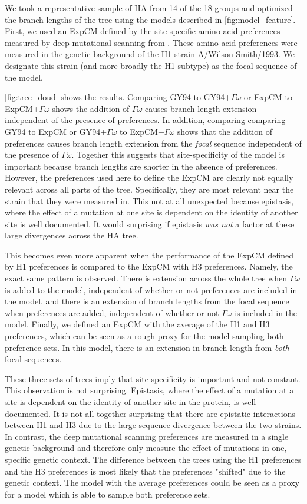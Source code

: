 \documentclass[11pt]{article}
\begin{document}
We took a representative sample of HA from 14 of the 18 groups and optimized the branch lengths of the tree using the models described in \ref{fig:model_feature}. 
First, we used an ExpCM defined by the site-specific amino-acid preferences measured by deep mutational scanning from \cite{doud2016accurate}. 
These amino-acid preferences were measured in the genetic background of the H1 strain A/Wilson-Smith/1993. 
We designate this strain (and more broadly the H1 subtype) as the focal sequence of the model. 

\ref{fig:tree_doud} shows the results. 
Comparing GY94 to GY94+$\Gamma\omega$ or ExpCM to ExpCM+$\Gamma\omega$ shows the addition of $\Gamma\omega$ causes branch length extension independent of the presence of preferences. 
In addition, comparing comparing GY94 to ExpCM or GY94+$\Gamma\omega$ to ExpCM+$\Gamma\omega$ shows that the addition of preferences causes branch length extension from the \textit{focal} sequence independent of the presence of $\Gamma\omega$. 
Together this suggests that site-specificity of the model is important because branch lengths are shorter in the absence of preferences. 
However, the preferences used here to define the ExpCM are clearly not equally relevant across all parts of the tree. 
Specifically, they are most relevant near the strain that they were measured in. 
This not at all unexpected because epistasis, where the effect of a mutation at one site is dependent on the identity of another site is well documented. 
It would surprising if epistasis \textit{was not} a factor at these large divergences across the HA tree. 

This becomes even more apparent when the performance of the ExpCM defined by H1 preferences is compared to the ExpCM with H3 preferences. 
Namely, the exact same pattern is observed. 
There is extension across the whole tree when $\Gamma\omega$ is added to the model, independent of whether or not preferences are included in the model, and there is an extension of branch lengths from the focal sequence when preferences are added, independent of whether or not $\Gamma\omega$ is included in the model. 
Finally, we defined an ExpCM with the average of the H1 and H3 preferences, which can be seen as a rough proxy for the model sampling both preference sets. 
In this model, there is an extension in branch length from \textit{both} focal sequences. 

These three sets of trees imply that site-specificity is important and not constant. 
This observation is not surprising. 
Epistasis, where the effect of a mutation at a site is dependent on the identity of another site in the protein, is well documented. 
It is not all together surprising that there are epistatic interactions between H1 and H3 due to the large sequence divergence between the two strains. 
In contrast, the deep mutational scanning preferences are measured in a single genetic background and therefore only measure the effect of mutations in one, specific genetic context.  
The difference between the trees using the H1 preferences and the H3 preferences is most likely that the preferences "shifted" due to the genetic context. 
The model with the average preferences could be seen as a proxy for a model which is able to sample both preference sets. 
\end{document}
